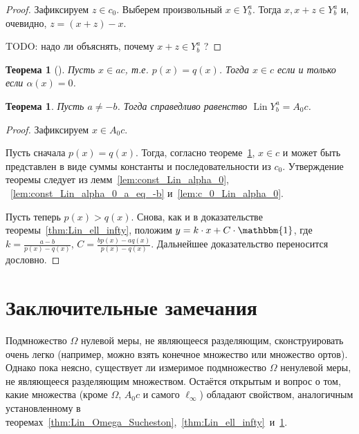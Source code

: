 \documentclass[a4paper,14pt]{article} %
\theoremstyle{plain}
\newtheorem{theorem}[lemma]{Теорема}
\begin{document}
\begin{proof}
	Зафиксируем $z\in c_0$.
	Выберем произвольный $x \in Y^a_b$.
	Тогда $x, x+z\in Y^a_b$ и, очевидно, $z=(x+z)-x$.

	TODO: надо ли объяснять, почему $x+z\in Y^a_b$ ?
\end{proof}

\begin{theorem}[{\cite[следствие 2]{our-mz2019ac0}}]
	\label{thm:alpha_c_ac_c}
	Пусть $x\in ac$, т.е. $p(x) = q(x)$.
	Тогда $x\in c$ если и только если $\alpha(x) = 0$.
\end{theorem}

\begin{theorem}
	\label{thm:A_0_c_infty_lin}
	Пусть $a\neq -b$.
	Тогда справедливо равенство $\operatorname{Lin} Y^a_b = A_0 c$.
\end{theorem}

\begin{proof}
	Зафиксируем $x \in A_0 c$.

	Пусть сначала $p(x) = q(x)$.
	Тогда, согласно теореме~\ref{thm:alpha_c_ac_c}, $x\in c$
	и может быть представлен в виде суммы константы и последовательности из $c_0$.
	Утверждение теоремы следует из лемм~\ref{lem:const_Lin_alpha_0}, ~\ref{lem:const_Lin_alpha_0_a_eq_-b} и~\ref{lem:c_0_Lin_alpha_0}.

	Пусть теперь $p(x) > q(x)$.
	Снова, как и в доказательстве теоремы~\ref{thm:Lin_ell_infty},
	положим $y=k\cdot x + C\cdot\mathbbm{1}$,
	где $k=\frac{a-b}{p(x)-q(x)}$, $C=\frac{bp(x)-aq(x)}{p(x)-q(x)}$.
	Дальнейшее доказательство переносится дословно.
\end{proof}


\section{Заключительные замечания}
Подмножество $\Omega$ нулевой меры, не являющееся разделяющим, сконструировать очень легко
(например, можно взять конечное множество или множество ортов).
Однако пока неясно, существует ли измеримое подмножество $\Omega$ ненулевой меры,
не являющееся разделяющим множеством.
Остаётся открытым и вопрос о том, какие множества (кроме $\Omega$, $A_0 c$ и самого $\ell_\infty$)
обладают свойством, аналогичным установленному в теоремах~\ref{thm:Lin_Omega_Sucheston},~\ref{thm:Lin_ell_infty}~и~\ref{thm:A_0_c_infty_lin}.


\printbibliography
\end{document}
